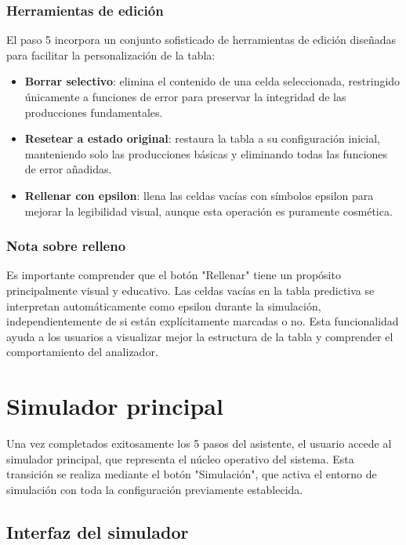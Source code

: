 \subsubsection{Herramientas de edición}

El paso 5 incorpora un conjunto sofisticado de herramientas de edición diseñadas para facilitar la personalización de la tabla:

\begin{itemize}
    \item \textbf{Borrar selectivo}: elimina el contenido de una celda seleccionada, restringido únicamente a funciones de error para preservar la integridad de las producciones fundamentales.
    \item \textbf{Resetear a estado original}: restaura la tabla a su configuración inicial, manteniendo solo las producciones básicas y eliminando todas las funciones de error añadidas.
    \item \textbf{Rellenar con epsilon}: llena las celdas vacías con símbolos epsilon para mejorar la legibilidad visual, aunque esta operación es puramente cosmética.
\end{itemize}

\subsubsection{Nota sobre relleno}

Es importante comprender que el botón \string"Rellenar\string" tiene un propósito principalmente visual y educativo. Las celdas vacías en la tabla predictiva se interpretan automáticamente como epsilon durante la simulación, independientemente de si están explícitamente marcadas o no. Esta funcionalidad ayuda a los usuarios a visualizar mejor la estructura de la tabla y comprender el comportamiento del analizador.

\section{Simulador principal}

Una vez completados exitosamente los 5 pasos del asistente, el usuario accede al simulador principal, que representa el núcleo operativo del sistema. Esta transición se realiza mediante el botón \string"Simulación\string", que activa el entorno de simulación con toda la configuración previamente establecida.

\subsection{Interfaz del simulador}

